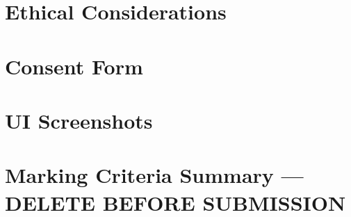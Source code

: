 \documentclass[11pt]{article}
\newif\ifguidance
\newcommand{\guidance}[1]{\ifguidance\textcolor{blue}{\small\textit{[#1]}}\fi}
\begin{document}


\section{Ethical Considerations}
\label{app:ethics}

\guidance{%
  Address: (1) informed consent, (2) data protection and GDPR compliance,
  (3) participant rights (voluntary participation, right to withdraw),
  (4) risk mitigation, and (5) broader considerations such as bias in
  conversational agents.}



\section{Consent Form}
\label{app:consent}



\section{UI Screenshots}
\label{app:ui}

\guidance{%
  Include screenshots showing typical system behaviours during
  interaction (e.g.\ session start, slot filling, handling pauses,
  self-correction, interruption, session end). These help demonstrate
  that the system functions well (Implementation criterion, 20 marks).}



\ifguidance
\newpage
\section*{Marking Criteria Summary --- DELETE BEFORE SUBMISSION}
\end{document}
